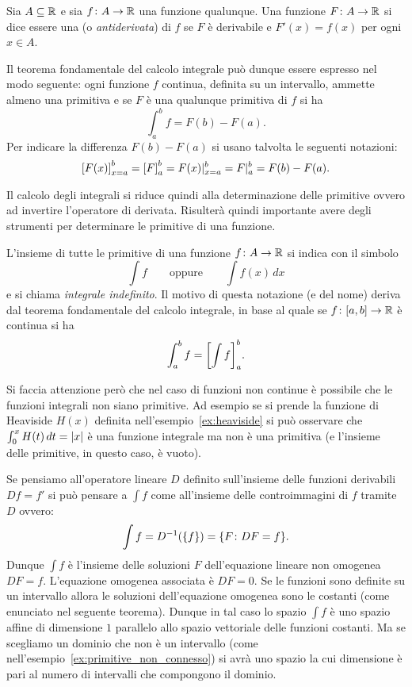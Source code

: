 \begin{definition}[primitiva]
\label{def:primitiva}%
\mymark{***}%
Sia $A \subseteq {\mathbb R}$ e sia $f\colon A \to {\mathbb R}$ una funzione qualunque.
Una funzione $F\colon A \to {\mathbb R}$ si dice essere una 
(o \emph{antiderivata})
di $f$ se $F$ è derivabile e $F'(x)=f(x)$ per ogni $x\in A$.
\end{definition}

Il teorema fondamentale del calcolo integrale può dunque essere espresso nel
modo seguente: ogni funzione $f$ continua, definita su un intervallo,
ammette almeno una primitiva e se $F$ è una qualunque primitiva di $f$ si ha
\[
  \int_a^b f = F(b) - F(a).
\]
Per indicare la differenza $F(b)-F(a)$ si usano
talvolta le seguenti notazioni:
\[
  {\left[ F(x) \right]}_{x=a}^b = {\left[ F \right]}_a^b
  = F(x) \vert_{x=a}^b
  = F \vert_a^b = F(b) - F(a).
\]

Il calcolo degli integrali si riduce quindi alla determinazione delle primitive
ovvero ad invertire l'operatore di derivata.
Risulterà quindi importante avere degli strumenti per determinare le primitive
di una funzione.

\begin{definition}
\mymark{***}
L'insieme di tutte le primitive di una funzione $f\colon A \to {\mathbb R}$
si indica con il simbolo
\[
  \int f
  \qquad\text{oppure}\qquad
  \int f(x) \, dx
\]
e si chiama \emph{integrale indefinito}.
Il motivo di questa notazione (e del nome) deriva dal teorema fondamentale del
calcolo integrale, in
base al quale se $f\colon[a,b]\to {\mathbb R}$
è continua si ha
\[
  \int_a^b f = {\left[ \int f \right]}_a^b.
\]
\end{definition}

\begin{remark}
Si faccia attenzione però che nel caso di funzioni non continue è possibile
che le funzioni integrali non siano primitive. Ad esempio
se si prende la funzione di Heaviside $H(x)$ definita nell'esempio~\ref{ex:heaviside}
si può osservare che $\int_0^x H(t)\, dt = {\left|x\right|}$
è una funzione integrale ma non è una primitiva (e l'insieme delle primitive,
in questo caso, è vuoto).
\end{remark}

Se pensiamo all'operatore lineare $D$ definito sull'insieme delle funzioni
derivabili $Df = f'$
si può pensare a $\int f$ come all'insieme delle controimmagini di $f$
tramite $D$ ovvero:
\[
  \int f = D^{-1}({\left\{ f \right\}}) = {\left\{ F \colon DF =f  \right\}}.
\]
Dunque $\int f$ è l'insieme delle soluzioni $F$ dell'equazione lineare
non omogenea $DF =f$. L'equazione omogenea associata è $DF = 0$.
Se le funzioni sono definite su un intervallo allora le soluzioni dell'equazione omogenea sono le costanti (come enunciato nel seguente teorema).
Dunque in tal caso lo spazio $\int f$ è uno spazio affine di dimensione $1$
parallelo allo spazio vettoriale delle funzioni costanti. 
Ma se scegliamo un dominio che non è un intervallo 
(come nell'esempio~\ref{ex:primitive_non_connesso}) 
si avrà uno spazio la cui dimensione è pari al numero di intervalli che compongono il dominio.

